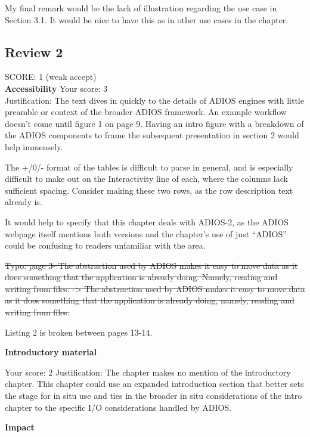 My final remark would be the lack of illustration regarding the use case in Section 3.1. It would be nice to have this as in other use cases in the chapter.


\subsection{Review 2} SCORE: 1 (weak accept) \\

\noindent\textbf{Accessibility} Your score: 3 \\

Justification: The text dives in quickly to the details of ADIOS engines with little preamble or context of the broader ADIOS framework. An example workflow doesn’t come until figure 1 on page 9. Having an intro figure with a breakdown of the ADIOS components to frame the subsequent presentation in section 2 would help immensely.

The +/0/- format of the tables is difficult to parse in general, and is especially difficult to make out on the Interactivity line of each, where the columns lack sufficient spacing. Consider making these two rows, as the row description text already is.

It would help to specify that this chapter deals with ADIOS-2, as the ADIOS webpage itself mentions both versions and the chapter’s use of just “ADIOS” could be confusing to readers unfamiliar with the area.

\sout{Typo: page 3- The abstraction used by ADIOS makes it easy to move data as it does something that the application is already doing. Namely, reading and writing from files.  -> The abstraction used by ADIOS makes it easy to move data as it does something that the application is already doing, namely, reading and writing from files.}

Listing 2 is broken between pages 13-14.

\noindent\textbf{Introductory material}

Your score: 2
Justification: The chapter makes no mention of the introductory chapter. This chapter could use an expanded introduction section that better sets the stage for in situ use and ties in the broader in situ considerations of the intro chapter to the specific I/O considerations handled by ADIOS.

\noindent\textbf{Impact}

